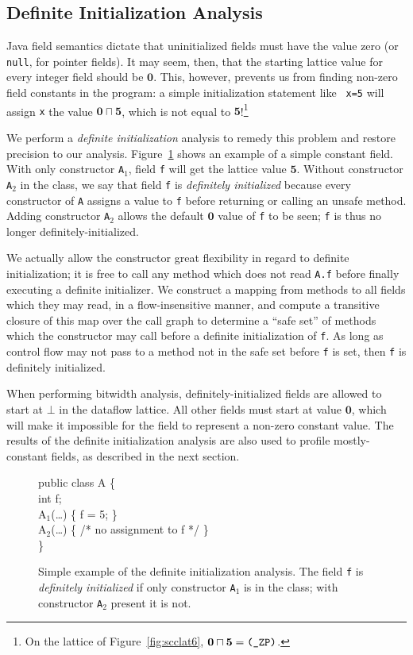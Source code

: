 \documentclass[oribibl]{llncs}
\newcommand{\meet}{\ensuremath{\sqcap}}
\begin{document}
\subsection{Definite Initialization Analysis}
Java field semantics dictate that uninitialized fields must have
the value zero (or {\tt null}, for pointer fields).  It may seem,
then, that the starting lattice value for every integer field should
be $\mathbf{0}$.  This, however, prevents us from finding non-zero field
constants in the program: a simple initialization statement like {\tt
  x=5} will assign {\tt x} the value $\mathbf{0}\meet\mathbf{5}$,
which is not equal to $\mathbf{5}$!\footnote{On the lattice of
  Figure~\ref{fig:scclat6}, $\mathbf{0}\meet\mathbf{5}=\text{\tt
    (\_ZP)}$.}

We perform a {\it definite initialization} analysis to remedy this
problem and restore precision to our analysis.
Figure~\ref{fig:definit-example} shows an example of a simple
constant field.
With only constructor {\tt A$_1$}, field {\tt f} will get the
lattice value $\mathbf{5}$.  Without constructor {\tt A$_2$} in the class,
we say that field {\tt f} is {\it definitely initialized} because
every constructor of {\tt A} assigns a value to {\tt f} before
returning or calling an unsafe method.
Adding constructor {\tt A$_2$} allows the
default $\mathbf{0}$ value of {\tt f} to be seen; {\tt f} is thus no longer
definitely-initialized.

We actually allow the constructor great flexibility in regard to
definite initialization; it is free to call any method which does not
read {\tt A.f} before finally executing a definite initializer.
We construct a mapping from methods to all
fields which they may read, in a flow-insensitive manner, and compute
a transitive closure of this map over the call graph to determine 
a ``safe set'' of
methods which the constructor may call before a definite
initialization of {\tt f}.  As long as control flow may not pass to a
method not in the safe set before {\tt f} is set, then {\tt f} is
definitely initialized.

When performing bitwidth analysis,
definitely-initialized fields are allowed to start at $\bot$ in the
dataflow lattice.  All other fields must start at value
$\mathbf{0}$, which will make it impossible for the field to represent a
non-zero constant value.  The results of the definite initialization
analysis are also used to profile mostly-constant fields, as described
in the next section.
%
\begin{figure}[tp]
\small\renewcommand{\baselinestretch}{0.5}\begin{samplecode}
public class A \{\\
\>int f;\\
\>A$_1$(\ldots) \{ f = 5; \}\\
\>A$_2$(\ldots) \{ /* no assignment to f */ \}\\
\}
\end{samplecode}
\caption{Simple example of the definite initialization analysis.
The field {\tt f} is {\it definitely initialized} if only constructor
{\tt A$_1$} is in the class; with constructor {\tt A$_2$} present it
is not.}
\label{fig:definit-example}
\end{figure}
\end{document}
